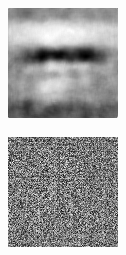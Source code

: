 \begin{figure}[H]
\begin{subfigure}[t]{0.13\textwidth}
  \end{subfigure}
  \begin{subfigure}[t]{0.13\textwidth}
    \centering
    \includegraphics[width=\linewidth]{img/one-trial/intermediate-cnnv3/prediction_0.png}
  \end{subfigure}
  \begin{subfigure}[t]{0.13\textwidth}
    \centering
    \includegraphics[width=\linewidth]{img/one-trial/intermediate-cnnv4/intermediate_0.png}

\end{subfigure}
\end{figure}
